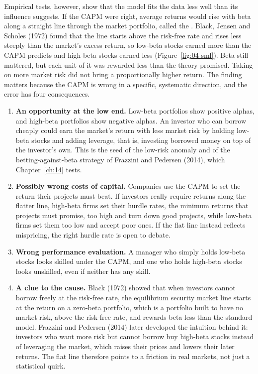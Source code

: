 Empirical tests, however, show that the model fits the data less well than its influence suggests. If the CAPM were right, average returns would rise with beta along a straight line through the market portfolio, called the . Black, Jensen and Scholes (1972) found that the line starts above the risk-free rate and rises less steeply than the market's excess return, so low-beta stocks earned more than the CAPM predicts and high-beta stocks earned less (Figure~\ref{fig:04-sml}). Beta still mattered, but each unit of it was rewarded less than the theory promised. Taking on more market risk did not bring a proportionally higher return. The finding matters because the CAPM is wrong in a specific, systematic direction, and the error has four consequences.

\begin{enumerate}
  \item \textbf{An opportunity at the low end.} Low-beta portfolios show positive alphas, and high-beta portfolios show negative alphas. An investor who can borrow cheaply could earn the market's return with less market risk by holding low-beta stocks and adding leverage, that is, investing borrowed money on top of the investor's own. This is the seed of the low-risk anomaly and of the betting-against-beta strategy of Frazzini and Pedersen (2014), which Chapter~\ref{ch:14} tests.
  \item \textbf{Possibly wrong costs of capital.} Companies use the CAPM to set the return their projects must beat. If investors really require returns along the flatter line, high-beta firms set their hurdle rates, the minimum returns that projects must promise, too high and turn down good projects, while low-beta firms set them too low and accept poor ones. If the flat line instead reflects mispricing, the right hurdle rate is open to debate.
  \item \textbf{Wrong performance evaluation.} A manager who simply holds low-beta stocks looks skilled under the CAPM, and one who holds high-beta stocks looks unskilled, even if neither has any skill.
  \item \textbf{A clue to the cause.} Black (1972) showed that when investors cannot borrow freely at the risk-free rate, the equilibrium security market line starts at the return on a zero-beta portfolio, which is a portfolio built to have no market risk, above the risk-free rate, and rewards beta less than the standard model. Frazzini and Pedersen (2014) later developed the intuition behind it: investors who want more risk but cannot borrow buy high-beta stocks instead of leveraging the market, which raises their prices and lowers their later returns. The flat line therefore points to a friction in real markets, not just a statistical quirk.
\end{enumerate}

